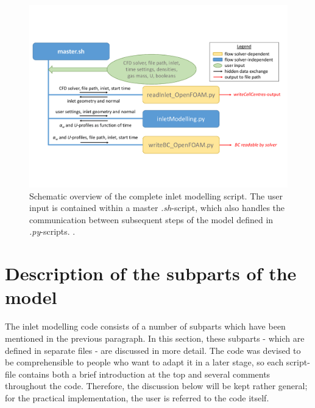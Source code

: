 \documentclass[fleqn,10pt,a4paper,twoside,english]{book}
\begin{document}
\begin{figure}[h!]
\includegraphics[width=\textwidth,trim={0cm 3cm 0cm 3cm},clip]{inletModelling_schematic.pdf}
\caption{Schematic overview of the complete inlet modelling script. The user input is contained within a master \textit{.sh}-script, which also handles the communication between subsequent steps of the model defined in \textit{.py}-scripts. \label{fig-schematic}. }
\end{figure}
\section{Description of the subparts of the model \label{subparts}}
The inlet modelling code consists of a number of subparts which have been mentioned in the previous paragraph. In this section, these subparts - which are defined in separate files - are discussed in more detail. The code was devised to be comprehensible to people who want to adapt it in a later stage, so each script-file contains both a brief introduction at the top and several comments throughout the code. Therefore, the discussion below will be kept rather general; for the practical implementation, the user is referred to the code itself.
\end{document}
